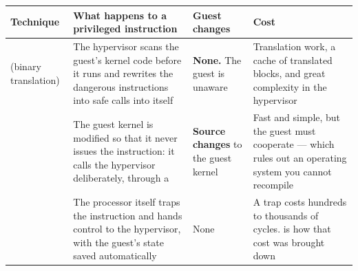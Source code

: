 \begin{longtable}{@{}L{3.5cm}L{4.6cm}L{3.2cm}L{3.4cm}@{}}
\toprule
{}
\textbf{Technique} & \textbf{What happens to a privileged instruction} &
\textbf{Guest changes} & \textbf{Cost} \\
\midrule
\endhead
{} (binary translation) & The hypervisor scans the
guest's kernel code before it runs and rewrites the dangerous instructions into
safe calls into itself & \textbf{None.} The guest is unaware & Translation
work, a cache of translated blocks, and great complexity in the hypervisor \\
 & The guest kernel is modified so that it never
issues the instruction: it calls the hypervisor deliberately, through a
 & \textbf{Source changes} to the guest kernel & Fast and
simple, but the guest must cooperate --- which rules out an operating system
you cannot recompile \\
 & The processor itself traps the instruction and hands
control to the hypervisor, with the guest's state saved automatically & None &
A trap costs hundreds to thousands of cycles.  is how that cost
was brought down \\
\bottomrule
\end{longtable}

